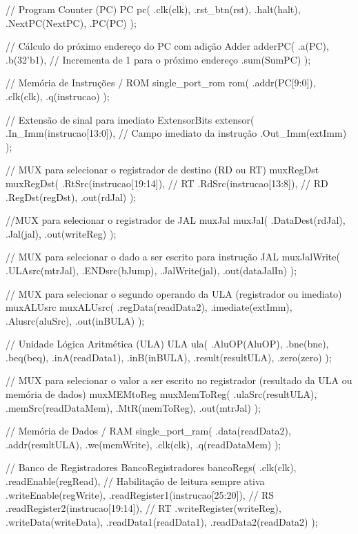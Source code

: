 \documentclass[
	12pt,				%
	openright,			%
	a4paper,			%
	english,			%
	french,				%
	spanish,			%
	brazil,				%
	]{abntex2}
\begin{document}
    // Program Counter (PC)
    PC pc(
        .clk(clk),
        .rst_btn(rst),
		  .halt(halt),
        .NextPC(NextPC),
        .PC(PC)
    );

    // Cálculo do próximo endereço do PC com adição
    Adder adderPC(
        .a(PC),
        .b(32'b1),               // Incrementa de 1 para o próximo endereço
        .sum(SumPC)
    );

    // Memória de Instruções / ROM
	 single_port_rom rom(
		  .addr(PC[9:0]),
		  .clk(clk),
		  .q(instrucao)
	 );
    

    // Extensão de sinal para imediato
    ExtensorBits extensor(
        .In_Imm(instrucao[13:0]),   // Campo imediato da instrução
        .Out_Imm(extImm)
    );

    // MUX para selecionar o registrador de destino (RD ou RT)
    muxRegDst muxRegDst(
        .RtSrc(instrucao[19:14]),   // RT
        .RdSrc(instrucao[13:8]),   // RD
        .RegDst(regDst),
        .out(rdJal)
    );
	 
	 //MUX para selecionar o registrador de JAL
	 muxJal muxJal(
		  .DataDest(rdJal),
		  .Jal(jal),
		  .out(writeReg)
	 );
	 
	 // MUX para selecionar o dado a ser escrito para instrução JAL
	 muxJalWrite(
		  .ULAsrc(mtrJal),
		  .ENDsrc(bJump),
		  .JalWrite(jal),
		  .out(dataJalIn)
	 );

    // MUX para selecionar o segundo operando da ULA (registrador ou imediato)
    muxALUsrc muxALUsrc(
        .regData(readData2),
        .imediate(extImm),
        .Alusrc(aluSrc),
        .out(inBULA)
    );

    // Unidade Lógica Aritmética (ULA)
    ULA ula(
        .AluOP(AluOP),
        .bne(bne),
        .beq(beq),
        .inA(readData1),
        .inB(inBULA),
        .result(resultULA),
        .zero(zero)
    );

    // MUX para selecionar o valor a ser escrito no registrador (resultado da ULA ou memória de dados)
    muxMEMtoReg muxMemToReg(
        .ulaSrc(resultULA),
        .memSrc(readDataMem),
        .MtR(memToReg),
        .out(mtrJal)
    );

    // Memória de Dados / RAM
	 single_port_ram(
		  .data(readData2),
		  .addr(resultULA),
		  .we(memWrite), 
		  .clk(clk),
		  .q(readDataMem)
	 );
	 
    // Banco de Registradores
    BancoRegistradores bancoRegs(
        .clk(clk),
        .readEnable(regRead),              // Habilitação de leitura sempre ativa
        .writeEnable(regWrite),
        .readRegister1(instrucao[25:20]), // RS
        .readRegister2(instrucao[19:14]), // RT
        .writeRegister(writeReg),
        .writeData(writeData),
        .readData1(readData1),
        .readData2(readData2)
    );
\end{document}
